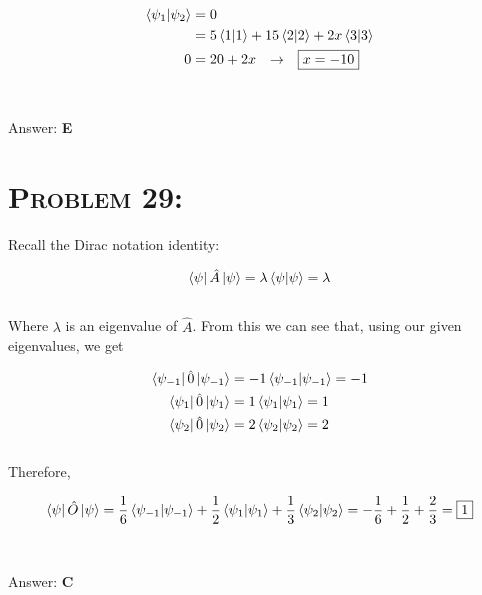 \documentclass{article}
\begin{document}
\begin{align}
\braket{\psi_{1} | \psi_{2}} &= 0\nonumber\\
&= 5 \braket{ 1 | 1 }  + 15 \braket{ 2 | 2 }  + 2x \braket{ 3 | 3 } \nonumber\\
0 &= 20 + 2x \hspace{.1in} \rightarrow \hspace{.1in} \boxed{x = - 10}\nonumber
\end{align}
\\\\
Answer: \textbf{\textcolor{ProcessBlue}E}\\


\section{\textsc{Problem 29:}} Recall the Dirac notation identity:

\begin{gather}
\bra{\psi} \hat{A} \ket{\psi} =  \lambda \braket {\psi  | \psi} = \lambda
\end{gather}
\\
Where $\lambda$ is an eigenvalue of $\hat{A}$. From this we can see that, using our given eigenvalues, we get

\begin{align}
\bra{\psi_{-1}} \hat{0} \ket{\psi_{-1}} &= -1 \braket {\psi_{-1}  | \psi_{-1}} = -1\nonumber\\
\bra{\psi_{1}} \hat{0} \ket{\psi_{1}} &= 1 \braket {\psi_{1}  | \psi_{1}} = 1\nonumber\\
\bra{\psi_{2}} \hat{0} \ket{\psi_{2}} &= 2 \braket {\psi_{2}  | \psi_{2}} = 2\nonumber
\end{align}
\\
Therefore,

\begin{gather}
\bra{\psi} \hat{O} \ket{\psi} = \frac{1}{6} \braket {\psi_{-1}  | \psi_{-1}} + \frac{1}{2} \braket {\psi_{1}  | \psi_{1}} + \frac{1}{3} \braket {\psi_{2}  | \psi_{2}} = -\frac{1}{6} + \frac{1}{2} + \frac{2}{3} = \boxed{1}\nonumber
\end{gather}
\\\\
Answer: \textbf{\textcolor{ProcessBlue}C}\\

\end{document}
